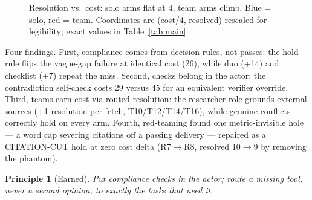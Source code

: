 \documentclass[11pt]{article}
\newtheorem{principle}{Principle}
\begin{document}
\begin{figure}[h]
\centering
{}
\caption{Resolution vs.\ cost: solo arms flat at 4, team arms climb. Blue =
solo, red = team. Coordinates are (cost/4, resolved) rescaled for legibility;
exact values in Table~\ref{tab:main}.}
\label{fig:cost}
\end{figure}

Four findings. First, compliance comes from decision rules, not passes: the
hold rule flips the vague-gap failure at identical cost (26), while duo (+14)
and checklist (+7) repeat the miss. Second, checks belong in the actor: the
contradiction self-check costs 29 versus 45 for an equivalent verifier
override. Third, teams earn cost via routed resolution: the researcher role
grounds external sources (+1 resolution per fetch, T10/T12/T14/T16), while
genuine conflicts correctly hold on every arm. Fourth, red-teaming found one
metric-invisible hole --- a word cap severing citations off a passing delivery
--- repaired as a CITATION-CUT hold at zero cost delta (R7$\to$R8, resolved
10$\to$9 by removing the phantom).

\begin{principle}[Earned]
Put compliance checks in the actor; route a missing tool, never a second
opinion, to exactly the tasks that need it.
\end{principle}
\end{document}
